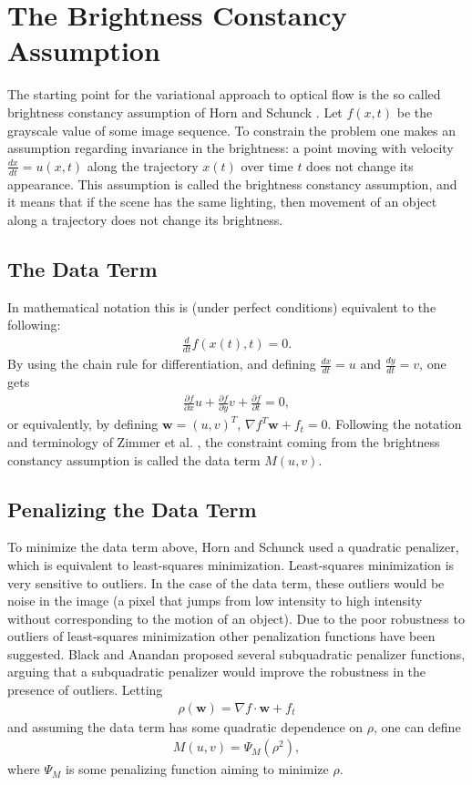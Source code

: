 \chapter{The Brightness Constancy Assumption}
The starting point for the variational approach to optical flow is the so called brightness constancy assumption of Horn and Schunck \cite{HS}. Let $f(x,t)$ be the grayscale value of some image sequence. To constrain the problem one makes an assumption regarding invariance in the brightness: a point moving with velocity $\frac{dx}{dt} = u(x,t)$ along the trajectory $x(t)$ over time $t$ does not change its appearance. This assumption is called the brightness constancy assumption, and it means that if the scene has the same lighting, then movement of an object along a trajectory does not change its brightness.
\section{The Data Term}
In mathematical notation this is (under perfect conditions) equivalent to the following:
\begin{align*}
\frac{d}{dt}f(x(t),t) = 0.
\end{align*}
By using the chain rule for differentiation, and defining $\frac{dx}{dt} = u$ and $\frac{dy}{dt} = v$, one gets
\begin{align*}
\frac{\partial f}{\partial x} u + \frac{\partial f}{\partial y} v + \frac{\partial f}{\partial t} = 0,
\end{align*}
or equivalently, by defining $\textbf{w} = (u,v)^T$, $\nabla f^T  \textbf{w} + f_t = 0$. Following the notation and terminology of Zimmer et al. \cite{zimmer2011optic}, the constraint coming from the brightness constancy assumption is called the data term $M(u,v)$.

\section{Penalizing the Data Term}
To minimize the data term above, Horn and Schunck used a quadratic penalizer, which is equivalent to least-squares minimization. Least-squares minimization is very sensitive to outliers. In the case of the data term, these outliers would be noise in the image (a pixel that jumps from low intensity to high intensity without corresponding to the motion of an object). Due to the poor robustness to outliers of least-squares minimization other penalization functions have been suggested. Black and Anandan \cite{Black199675} proposed several subquadratic penalizer functions, arguing that a subquadratic penalizer would improve the robustness in the presence of outliers. Letting
\begin{align*}
\rho(\textbf{w}) = \nabla f \cdot \textbf{w} + f_t
\end{align*}
and assuming the data term has some quadratic dependence on $\rho$, one can define
\begin{align}
\label{DataPenalize}
M(u,v) = \Psi_M(\rho^2),
\end{align}
where $\Psi_M$ is some penalizing function aiming to minimize $\rho$. 
